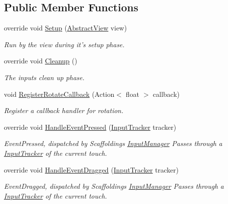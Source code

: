 \subsection*{Public Member Functions}
\begin{DoxyCompactItemize}
\item 
override void \hyperlink{class_scaffolding_1_1_rotate_input_a89be6ed5c624ff8f637fdc38227c4637}{Setup} (\hyperlink{class_scaffolding_1_1_abstract_view}{Abstract\-View} view)
\begin{DoxyCompactList}\small\item\em Run by the view during it's setup phase. \end{DoxyCompactList}\item 
override void \hyperlink{class_scaffolding_1_1_rotate_input_a85778a91b86665998c1b84f24c571e88}{Cleanup} ()
\begin{DoxyCompactList}\small\item\em The inputs clean up phase. \end{DoxyCompactList}\item 
void \hyperlink{class_scaffolding_1_1_rotate_input_a07b51f4f3db3e4e041f45a011319f8d9}{Register\-Rotate\-Callback} (Action$<$ float $>$ callback)
\begin{DoxyCompactList}\small\item\em Register a callback handler for rotation. \end{DoxyCompactList}\item 
override void \hyperlink{class_scaffolding_1_1_rotate_input_a4c37089dcaae6d1cb1785b45d5cec8b3}{Handle\-Event\-Pressed} (\hyperlink{class_scaffolding_1_1_input_tracker}{Input\-Tracker} tracker)
\begin{DoxyCompactList}\small\item\em Event\-Pressed, dispatched by Scaffoldings \hyperlink{class_scaffolding_1_1_input_manager}{Input\-Manager} Passes through a \hyperlink{class_scaffolding_1_1_input_tracker}{Input\-Tracker} of the current touch. \end{DoxyCompactList}\item 
override void \hyperlink{class_scaffolding_1_1_rotate_input_afffb85f2f27b314bde50d0e45d6117d5}{Handle\-Event\-Dragged} (\hyperlink{class_scaffolding_1_1_input_tracker}{Input\-Tracker} tracker)
\begin{DoxyCompactList}\small\item\em Event\-Dragged, dispatched by Scaffoldings \hyperlink{class_scaffolding_1_1_input_manager}{Input\-Manager} Passes through a \hyperlink{class_scaffolding_1_1_input_tracker}{Input\-Tracker} of the current touch. \end{DoxyCompactList}\item 

\end{DoxyCompactItemize}
